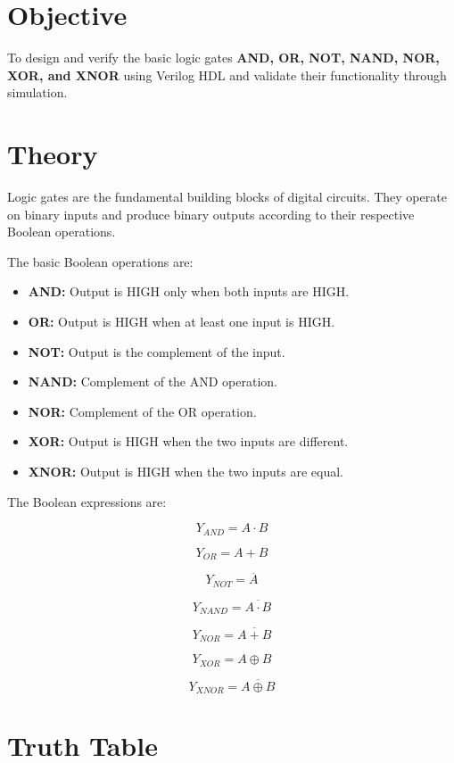 \documentclass[12pt,a4paper]{report}
\begin{document}
\section{Objective}

To design and verify the basic logic gates \textbf{AND, OR, NOT, NAND, NOR, XOR, and XNOR} using Verilog HDL and validate their functionality through simulation.

\section{Theory}

Logic gates are the fundamental building blocks of digital circuits. They operate on binary inputs and produce binary outputs according to their respective Boolean operations.

The basic Boolean operations are:

\begin{itemize}
    \item \textbf{AND:} Output is HIGH only when both inputs are HIGH.
    \item \textbf{OR:} Output is HIGH when at least one input is HIGH.
    \item \textbf{NOT:} Output is the complement of the input.
    \item \textbf{NAND:} Complement of the AND operation.
    \item \textbf{NOR:} Complement of the OR operation.
    \item \textbf{XOR:} Output is HIGH when the two inputs are different.
    \item \textbf{XNOR:} Output is HIGH when the two inputs are equal.
\end{itemize}

The Boolean expressions are:

\[
Y_{AND}=A\cdot B
\]

\[
Y_{OR}=A+B
\]

\[
Y_{NOT}=\overline{A}
\]

\[
Y_{NAND}=\overline{A\cdot B}
\]

\[
Y_{NOR}=\overline{A+B}
\]

\[
Y_{XOR}=A\oplus B
\]

\[
Y_{XNOR}=\overline{A\oplus B}
\]

\section{Truth Table}
\end{document}
